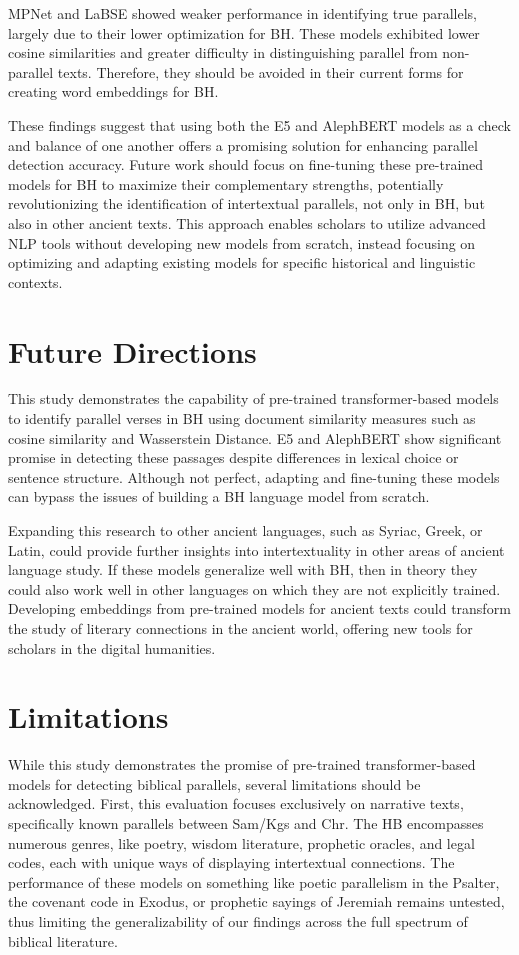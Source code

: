 \documentclass[12pt]{article}
\begin{document}
MPNet and LaBSE showed weaker performance in identifying true parallels, largely due to their lower optimization for BH. These models exhibited lower cosine similarities and greater difficulty in distinguishing parallel from non-parallel texts. Therefore, they should be avoided in their current forms for creating word embeddings for BH.

These findings suggest that using both the E5 and AlephBERT models as a check and balance of one another offers a promising solution for enhancing parallel detection accuracy. Future work should focus on fine-tuning these pre-trained models for BH to maximize their complementary strengths, potentially revolutionizing the identification of intertextual parallels, not only in BH, but also in other ancient texts. This approach enables scholars to utilize advanced NLP tools without developing new models from scratch, instead focusing on optimizing and adapting existing models for specific historical and linguistic contexts.

\section{Future Directions}
This study demonstrates the capability of pre-trained transformer-based models to identify parallel verses in BH using document similarity measures such as cosine similarity and Wasserstein Distance. E5 and AlephBERT show significant promise in detecting these passages despite differences in lexical choice or sentence structure. Although not perfect, adapting and fine-tuning these models can bypass the issues of building a BH language model from scratch.

Expanding this research to other ancient languages, such as Syriac, Greek, or Latin, could provide further insights into intertextuality in other areas of ancient language study. If these models generalize well with BH, then in theory they could also work well in other languages on which they are not explicitly trained. Developing embeddings from pre-trained models for ancient texts could transform the study of literary connections in the ancient world, offering new tools for scholars in the digital humanities.

\section{Limitations}
While this study demonstrates the promise of pre-trained transformer-based models for detecting biblical parallels, several limitations should be acknowledged. First, this evaluation focuses exclusively on narrative texts, specifically known parallels between Sam/Kgs and Chr. The HB encompasses numerous genres, like poetry, wisdom literature, prophetic oracles, and legal codes, each with unique ways of displaying intertextual connections. The performance of these models on something like poetic parallelism in the Psalter, the covenant code in Exodus, or prophetic sayings of Jeremiah remains untested, thus limiting the generalizability of our findings across the full spectrum of biblical literature.
\end{document}

